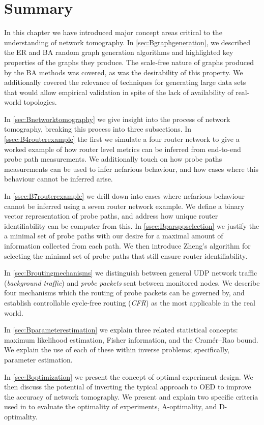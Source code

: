 \section{Summary}
In this chapter we have introduced major concept areas critical to the understanding of network tomography. In \cref{sec:Bgraphgeneration}, we described the ER and BA random graph generation algorithms and highlighted key properties of the graphs they produce. The scale-free nature of graphs produced by the BA methods was covered, as was the desirability of this property. We additionally covered the relevance of techniques for generating large data sets that would allow empirical validation in spite of the lack of availability of real-world topologies.\par
In \cref{sec:Bnetworktomography} we give insight into the process of network tomography, breaking this process into three subsections. In \cref{ssec:B4routerexample} the first we simulate a four router network to give a worked example of how router level metrics can be inferred from end-to-end probe path measurements. We additionally touch on how probe paths measurements can be used to infer nefarious behaviour, and how cases where this behaviour cannot be inferred arise.\par
In \cref{ssec:B7routerexample} we drill down into cases where nefarious behaviour cannot be inferred using a seven router network example. We define a binary vector representation of probe paths, and address how unique router identifiability can be computer from this. In \cref{ssec:Bparsppselection} we justify the a minimal set of probe paths with our desire for a maximal amount of information collected from each path. We then introduce Zheng's algorithm for selecting the minimal set of probe paths that still ensure router identifiability.\par
In \cref{sec:Broutingmechanisms} we distinguish between general UDP network traffic (\textit{background traffic}) and \textit{probe packets} sent between monitored nodes. We describe four mechanisms which the routing of probe packets can be governed by, and establish controllable cycle-free routing (\textit{CFR}) as the most applicable in the real world.\par
In \cref{sec:Bparameterestimation} we explain three related statistical concepts: maximum likelihood estimation, Fisher information, and the Cramér–Rao bound. We explain the use of each of these within inverse problems; specifically, parameter estimation.\par
In \cref{sec:Boptimization} we present the concept of optimal experiment design. We then discuss the potential of inverting the typical approach to OED to improve the accuracy of network tomography. We present and explain two specific criteria used in to evaluate the optimality of experiments, A-optimality, and D-optimality.\par
